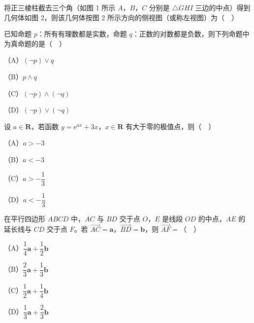\begingroup
\renewenvironment{question}{\Needspace{0.5\textheight}}{}
\begin{question}
将正三棱柱截去三个角（如图 1 所示 $A$，$B$，$C$ 分别是 $\triangle GHI$ 三边的中点）得到几何体如图 2，则该几何体按图 2 所示方向的侧视图（或称左视图）为（　）
\nopagebreak[4]
\begin{center}\end{center}
\nopagebreak[4]
\end{question}
\endgroup
\begin{question}
已知命题 $p$：所有有理数都是实数，命题 $q$：正数的对数都是负数，则下列命题中为真命题的是（　）

（A）$(\neg p)\vee q$

（B）$p\wedge q$

（C）$(\neg p)\wedge(\neg q)$

（D）$(\neg p)\vee(\neg q)$

\end{question}
\begin{question}
设 $a\in\mathbf R$，若函数 $y=\mathrm e^{ax}+3x$，$x\in\mathbf R$ 有大于零的极值点，则（　）

（A）$a>-3$

（B）$a<-3$

（C）$a>-\dfrac13$

（D）$a<-\dfrac13$

\end{question}
\begin{question}
在平行四边形 $ABCD$ 中，$AC$ 与 $BD$ 交于点 $O$，$E$ 是线段 $OD$ 的中点，$AE$ 的延长线与 $CD$ 交于点 $F$。若 $\overrightarrow{AC}=\boldsymbol a$，$\overrightarrow{BD}=\boldsymbol b$，则 $\overrightarrow{AF}=$（　）

（A）$\dfrac14\boldsymbol a+\dfrac12\boldsymbol b$

（B）$\dfrac23\boldsymbol a+\dfrac13\boldsymbol b$

（C）$\dfrac12\boldsymbol a+\dfrac14\boldsymbol b$

（D）$\dfrac13\boldsymbol a+\dfrac23\boldsymbol b$

\end{question}

